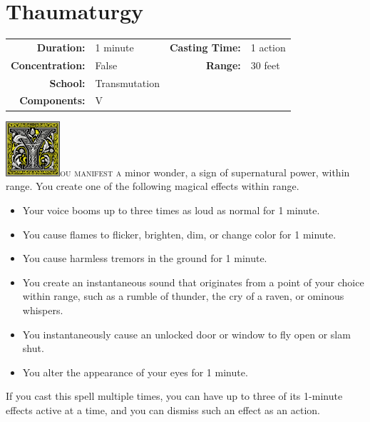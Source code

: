 \documentclass[12pt,showtrims]{memoir}
\begin{document}
\newpage
\section*{Thaumaturgy}

{
\small\centering\vspace{-6pt}
\begin{tabular}{rlrl}
\toprule

\textbf{Duration:} & 1 minute &
\textbf{Casting Time:} & 1 action \\
\textbf{Concentration:} & False &
\textbf{Range:} & 30 feet \\
\textbf{School:} & Transmutation \\
\textbf{Components:} & \multicolumn{3}{p{0.7\textwidth}}{V}\\

\bottomrule
\end{tabular}
}

\vspace{1\baselineskip}\noindent
\lettrine[lines=4]{\includegraphics[height=58pt]{initials/Y.png}}{ou manifest a} minor wonder, a sign of supernatural power, within range. You create one of the following magical effects within range.
\vspace{6pt}
\begin{itemize}
    \item Your voice booms up to three times as loud as normal for 1 minute.
    \item You cause flames to flicker, brighten, dim, or change color for 1 minute.
    \item You cause harmless tremors in the ground for 1 minute.
    \item You create an instantaneous sound that originates from a point of your choice within range, such as a rumble of thunder, the cry of a raven, or ominous whispers.
    \item You instantaneously cause an unlocked door or window to fly open or slam shut.
    \item You alter the appearance of your eyes for 1 minute. 
\end{itemize}

\noindent
If you cast this spell multiple times, you can have up to three of its 1-minute effects active at a time, and you can dismiss such an effect as an action.
\end{document}
